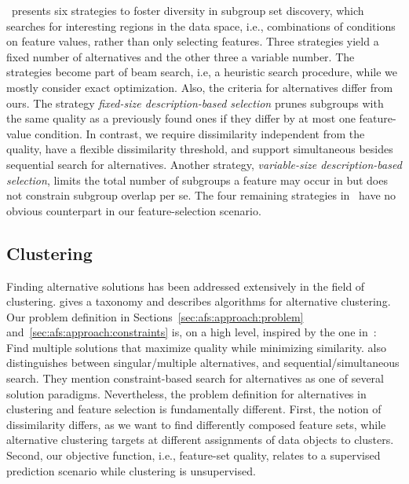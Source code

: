 \documentclass{article}
\theoremstyle{definition}
\begin{document}
\cite{leeuwen2012diverse}~presents six strategies to foster diversity in subgroup set discovery, which searches for interesting regions in the data space, i.e., combinations of conditions on feature values, rather than only selecting features.
Three strategies yield a fixed number of alternatives and the other three a variable number.
The strategies become part of beam search, i.e, a heuristic search procedure, while we mostly consider exact optimization.
Also, the criteria for alternatives differ from ours.
The strategy \emph{fixed-size description-based selection} prunes subgroups with the same quality as a previously found ones if they differ by at most one feature-value condition.
In contrast, we require dissimilarity independent from the quality, have a flexible dissimilarity threshold, and support simultaneous besides sequential search for alternatives.
Another strategy, \emph{variable-size description-based selection}, limits the total number of subgroups a feature may occur in but does not constrain subgroup overlap per se.
The four remaining strategies in~\cite{leeuwen2012diverse} have no obvious counterpart in our feature-selection scenario.

\subsection{Clustering}
\label{sec:afs:related-work:clustering}

Finding alternative solutions has been addressed extensively in the field of clustering.
\cite{bailey2014alternative} gives a taxonomy and describes algorithms for alternative clustering.
Our problem definition in Sections~\ref{sec:afs:approach:problem} and~\ref{sec:afs:approach:constraints} is, on a high level, inspired by the one in~\cite{bailey2014alternative}:
Find multiple solutions that maximize quality while minimizing similarity.
\cite{bailey2014alternative} also distinguishes between singular/multiple alternatives, and sequential/simultaneous search.
They mention constraint-based search for alternatives as one of several solution paradigms.
Nevertheless, the problem definition for alternatives in clustering and feature selection is fundamentally different.
First, the notion of dissimilarity differs, as we want to find differently composed feature sets, while alternative clustering targets at different assignments of data objects to clusters.
Second, our objective function, i.e., feature-set quality, relates to a supervised prediction scenario while clustering is unsupervised.
\end{document}

